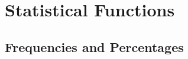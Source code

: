 %
%
%
%
%
%
%
%
%
%
%
%
%
%
%
%



\chapter{Statistical Functions}
\label{DescriptiveStatistics} 


\section{Frequencies and Percentages}


